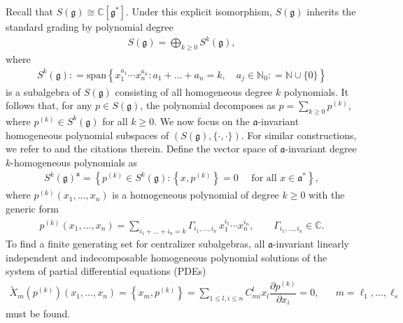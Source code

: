 \documentclass[11pt,reqno]{amsart}
\newtheorem*{theorem A}{Main Theorem A}
\newtheorem*{theorem B}{Main Theorem B}
\newtheorem*{theorem C}{Main Theorem C}
\newtheorem*{theorem D}{Main Theorem D}
\theoremstyle{definition}
\theoremstyle{plain}
\theoremstyle{conclusion}
\begin{document}
 Recall that $S(\mathfrak{g}) \cong \mathbb{C}[\mathfrak{g}^*]$. Under this explicit isomorphism, $S(\mathfrak{g})$ inherits the standard grading by polynomial degree  \begin{align}
   S(\mathfrak{g}) = \bigoplus_{k \geq 0} S^k(\mathfrak{g})  ,
\end{align} where  \begin{align}
     S^k(\mathfrak{g}) : = \mathrm{span} \left\{x_1^{a_1} \cdots x_n^{a_n}: a_1 +  \ldots +  a_n = k, \quad a_j \in \mathbb{N}_0 : =\mathbb{N} \cup \{0\}\right\} \label{eq:homopoly}
 \end{align} is a subalgebra of $S(\mathfrak{g})$ consisting of all homogeneous degree $k$ polynomials. It follows that, for any $p \in S(\mathfrak{g})$, the polynomial decomposes as $p = \sum_{k \geq 0} p^{(k)}$, where $p^{(k)} \in S^k(\mathfrak{g})$ for all $k \geq 0$.  We now focus on the $\mathfrak{a}$-invariant homogeneous polynomial subspaces of $\left(S(\mathfrak{g}),\{\cdot,\cdot\}\right)$.   For similar constructions, we refer to \cite{MR191995,MR1520346, MarquetteZhangZhangAOP2025} and the citations therein. Define the vector space of $\mathfrak{a}$-invariant degree $k$-homogeneous polynomials as
\begin{align*}
 S^k(\mathfrak{g})^{\mathfrak{a}}  = \left\{p^{(k)} \in S^k(\mathfrak{g}): \left\{x,p^{(k)}\right\} = 0  \quad \text{ for all } x \in \mathfrak{a}^*\right\},
\end{align*}
where $p^{(k)}(x_1,\ldots,x_n)$ is a homogeneous polynomial of degree $k \geq 0$ with the generic form
\begin{align}
    p^{(k)}(x_1,\ldots,x_n) = \sum_{i_1 +  \ldots +  i_n = k} \Gamma_{i_1,\ldots, i_n}\, x_1^{i_1} \cdots x_n^{i_n}, \qquad  \Gamma_{i_1,\ldots,  i_n} \in \mathbb{C}. \label{eq:ci}
\end{align} %
To find a finite generating set for centralizer subalgebras, all $\mathfrak{a}$-invariant linearly independent and indecomposable homogeneous polynomial solutions of the system of partial differential equations (PDEs)
\begin{align}
    \tilde{X}_m\left(p^{(k)}\right)(x_1,\ldots,x_n) = \left\{x_m,p^{(k)}\right\}  = \sum_{1 \leq l,i \leq n} C_{mi}^lx_l \dfrac{\partial p^{(k)}}{\partial x_i} = 0, \text{ }\quad m = \ell_1,\ldots,\ell_s  \label{eq:func}
\end{align}
must be found. 
\end{document}
